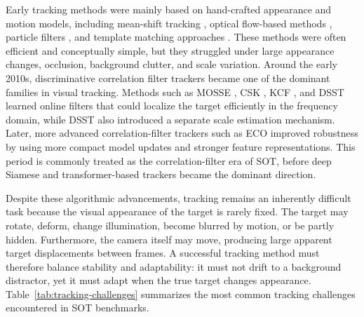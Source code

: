 \documentclass[bachelorthesis]{fer}
\numberwithin{equation}{chapter}
\begin{document}
    Early tracking methods were mainly based on hand-crafted appearance and motion models, including mean-shift tracking \cite{comaniciu2000mean}, optical flow-based methods \cite{lucas1981iterative,shi1994good}, particle filters \cite{isard1998condensation}, and template matching approaches \cite{matthews2004template}. These methods were often efficient and conceptually simple, but they struggled under large appearance changes, occlusion, background clutter, and scale variation. Around the early 2010s, discriminative correlation filter trackers became one of the dominant families in visual tracking. Methods such as MOSSE \cite{bolme2010mosse}, CSK \cite{henriques2012csk}, KCF \cite{henriques2015kcf}, and DSST \cite{danelljan2014dsst} learned online filters that could localize the target efficiently in the frequency domain, while DSST also introduced a separate scale estimation mechanism. Later, more advanced correlation-filter trackers such as ECO \cite{danelljan2017eco} improved robustness by using more compact model updates and stronger feature representations. This period is commonly treated as the correlation-filter era of SOT, before deep Siamese and transformer-based trackers became the dominant direction.

    Despite these algorithmic advancements, tracking remains an inherently difficult task because the visual appearance of the target is rarely fixed. The target may rotate, deform, change illumination, become blurred by motion, or be partly hidden. Furthermore, the camera itself may move, producing large apparent target displacements between frames. A successful tracking method must therefore balance stability and adaptability: it must not drift to a background distractor, yet it must adapt when the true target changes appearance. Table~\ref{tab:tracking-challenges} summarizes the most common tracking challenges encountered in SOT benchmarks.
\end{document}
